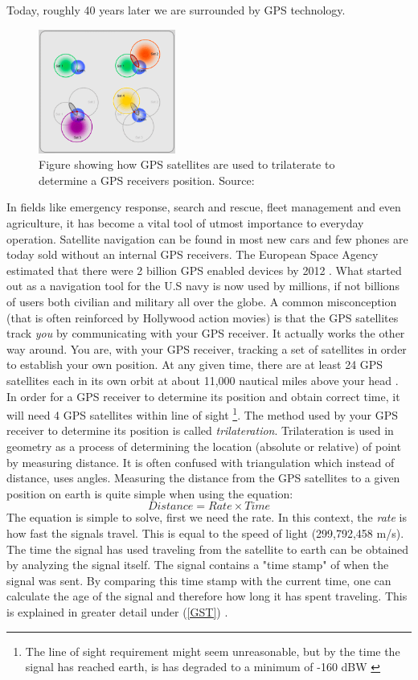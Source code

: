 \documentclass[12pt,english,a4paper]{article}
\begin{document}
Today, roughly 40 years later we are surrounded by GPS technology.
\begin{figure}
  \centering
  \includegraphics[width=0.40\textwidth]{trilaterate.jpg}
  \caption[GPS trilaterate figure]
   {Figure showing how GPS satellites are used to trilaterate to determine a GPS receivers position. Source: \cite{GISTRILATERATE}}
\end{figure}
In fields like emergency response, search and rescue, fleet management and even agriculture, it has become a vital tool of utmost importance to everyday operation. Satellite navigation can be found in most new cars and few phones are today sold without an internal GPS receivers. The European Space Agency estimated that there were 2 billion GPS enabled devices by 2012 \cite{ESA}. What started out as a navigation tool for the U.S navy is now used by millions, if not billions of users both civilian and military all over the globe. A common misconception (that is often reinforced by Hollywood action movies) is that the GPS satellites track \textit{you} by communicating with your GPS receiver. It actually works the other way around. You are, with your GPS receiver, tracking a set of satellites in order to establish your own position. At any given time, there are at least 24 GPS satellites each in its own orbit at about 11,000 nautical miles above your head \cite{GPSGOVSS}. In order for a GPS receiver to determine its position and obtain correct time, it will need 4 GPS satellites within line of sight \footnote{The line of sight requirement might seem unreasonable, but by the time the signal has reached earth, is has degraded to a minimum of -160 dBW \cite{NATINT}}.
The method used by your GPS receiver to determine its position is called \textit{trilateration}. 
Trilateration is used in geometry as a process of determining the location (absolute or relative) of point by measuring distance. It is often confused with triangulation which instead of distance, uses angles. Measuring the distance from the GPS satellites to a given position on earth is quite simple when using the equation: 
\begin{equation} Distance = Rate \times Time \end{equation} 
The equation is simple to solve, first we need the rate. In this context, the \textit{rate} is how fast the signals travel. This is equal to the speed of light (299,792,458 m/s). The time the signal has used traveling from the satellite to earth can be obtained by analyzing the signal itself. The signal contains a "time stamp" of when the signal was sent. By comparing this time stamp with the current time, one can calculate the age of the signal and therefore how long it has spent traveling. This is explained in greater detail under (\ref{GST}) \cite{GPSGOVTE}.  
\end{document}
